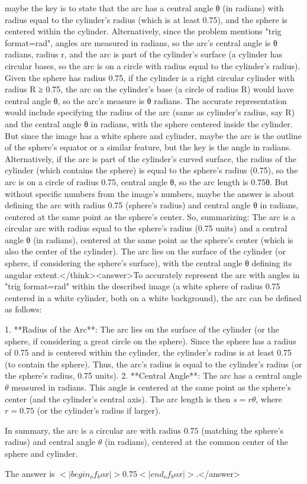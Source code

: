 maybe the key is to state that the arc has a central angle θ (in radians) with radius equal to the cylinder's radius (which is at least 0.75), and the sphere is centered within the cylinder. Alternatively, since the problem mentions "trig format=rad", angles are measured in radians, so the arc's central angle is θ radians, radius r, and the arc is part of the cylinder's surface (a cylinder has circular bases, so the arc is on a circle with radius equal to the cylinder's radius). Given the sphere has radius 0.75, if the cylinder is a right circular cylinder with radius R ≥ 0.75, the arc on the cylinder's base (a circle of radius R) would have central angle θ, so the arc's measure is θ radians. The accurate representation would include specifying the radius of the arc (same as cylinder's radius, say R) and the central angle θ in radians, with the sphere centered inside the cylinder. But since the image has a white sphere and cylinder, maybe the arc is the outline of the sphere's equator or a similar feature, but the key is the angle in radians. Alternatively, if the arc is part of the cylinder's curved surface, the radius of the cylinder (which contains the sphere) is equal to the sphere's radius (0.75), so the arc is on a circle of radius 0.75, central angle θ, so the arc length is 0.75θ. But without specific numbers from the image's numbers, maybe the answer is about defining the arc with radius 0.75 (sphere's radius) and central angle θ in radians, centered at the same point as the sphere's center. So, summarizing: The arc is a circular arc with radius equal to the sphere's radius (0.75 units) and a central angle θ (in radians), centered at the same point as the sphere's center (which is also the center of the cylinder). The arc lies on the surface of the cylinder (or sphere, if considering the sphere's surface), with the central angle θ defining its angular extent.</think><answer>To accurately represent the arc with angles in "trig format=rad" within the described image (a white sphere of radius 0.75 centered in a white cylinder, both on a white background), the arc can be defined as follows:  

1. **Radius of the Arc**: The arc lies on the surface of the cylinder (or the sphere, if considering a great circle on the sphere). Since the sphere has a radius of 0.75 and is centered within the cylinder, the cylinder’s radius is at least 0.75 (to contain the sphere). Thus, the arc’s radius is equal to the cylinder’s radius (or the sphere’s radius, 0.75 units).  
2. **Central Angle**: The arc has a central angle \( \theta \) measured in radians. This angle is centered at the same point as the sphere’s center (and the cylinder’s central axis). The arc length is then \( s = r\theta \), where \( r = 0.75 \) (or the cylinder’s radius if larger).  

In summary, the arc is a circular arc with radius \( 0.75 \) (matching the sphere’s radius) and central angle \( \theta \) (in radians), centered at the common center of the sphere and cylinder.  

The answer is \(<|begin_of_box|>0.75<|end_of_box|>\).</answer>